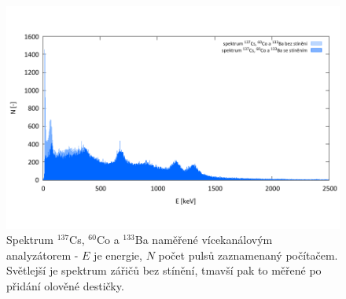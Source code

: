 \documentclass[english]{article}
\begin{document}
	\begin{figure}[h!]
	\begin{center}
	    \vspace*{-1cm}
		\includegraphics[width=\linewidth]{../gnuplot/BaCoCsandPb2.pdf}
	    \vspace*{-2cm}
		\caption{Spektrum $^{137}$Cs, $^{60}$Co a $^{133}$Ba naměřené vícekanálovým analyzátorem - $E$ je energie, $N$ počet pulsů zaznamenaný počítačem. Světlejší je spektrum zářičů bez stínění, tmavší pak to měřené po přidání olověné destičky.}
		\label{fig:g_BaCoCsPb2}
	\end{center}
	\end{figure}	
	
	

%
%
	
\end{document}

